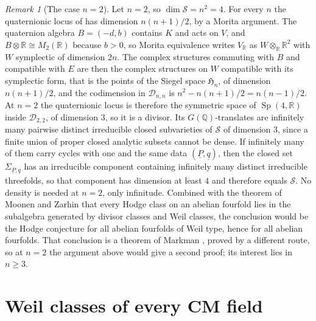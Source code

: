 \documentclass[11pt,reqno]{amsart}
\theoremstyle{plain}
\theoremstyle{definition}
\theoremstyle{remark}
\newtheorem{remark}[theorem]{Remark}
\newcommand{\QQ}{\mathbb{Q}}
\newcommand{\RR}{\mathbb{R}}
\newcommand{\cD}{\mathcal{D}}
\newcommand{\cS}{\mathcal{S}}
\DeclareMathOperator{\Sp}{Sp}
\begin{document}
\begin{remark}[The case $n=2$]\label{rem:ntwo}
Let $n=2$, so $\dim\cS=n^{2}=4$. For every $n$ the quaternionic locus of
 has dimension $n(n+1)/2$, by a Morita argument. The
quaternion algebra $B=(-d,b)$ contains $K$ and acts on $V$, and
$B\otimes\RR\cong M_{2}(\RR)$ because $b>0$, so Morita equivalence writes
$V_{\RR}$ as $W\otimes_{\RR}\RR^{2}$ with $W$ symplectic of dimension $2n$.
The complex structures commuting with $B$ and compatible with $E$ are then
the complex structures on $W$ compatible with its symplectic form, that is the
points of the Siegel
space $\mathfrak{H}_{n}$, of dimension $n(n+1)/2$, and the codimension in
$\cD_{n,n}$ is $n^{2}-n(n+1)/2=n(n-1)/2$. At
$n=2$ the quaternionic locus is therefore the symmetric space of
$\Sp(4,\RR)$ inside $\cD_{2,2}$, of dimension $3$, so it is a divisor. Its
$G(\QQ)$-translates are infinitely many
pairwise distinct irreducible closed subvarieties of $\cS$ of dimension $3$,
since a finite union of proper closed analytic subsets cannot be dense. If
infinitely many of them carry cycles with one and the same data
$(\underline{P},\underline{q})$, then the closed set
$\Sigma_{\underline{P},\underline{q}}$ has an irreducible component containing
infinitely many distinct irreducible threefolds, so that component has
dimension at least $4$ and therefore equals $\cS$. No density is needed at
$n=2$, only infinitude. Combined with the theorem of Moonen and Zarhin
\cite{MZ99} that every Hodge class on an abelian fourfold lies in the
subalgebra generated by divisor classes and Weil classes, the conclusion would
be the Hodge conjecture for all abelian fourfolds of Weil type, hence for all
abelian fourfolds. That conclusion is a theorem of Markman
\cite[Corollary~1.6.1]{Mar25a}, proved by a different route, so at $n=2$ the
argument above would give a second proof; its interest lies in $n\ge3$.
\end{remark}
\section{Weil classes of every CM field}\label{sec:cmfields}
\end{document}
